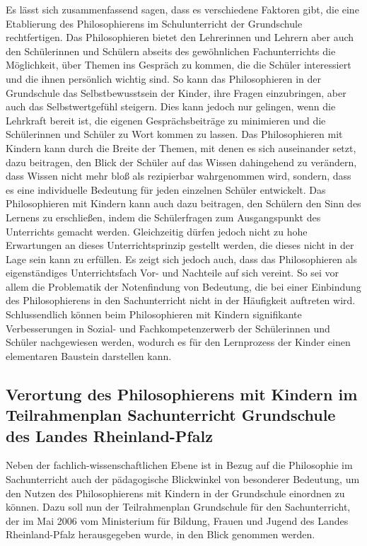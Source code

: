 Es lässt sich zusammenfassend sagen, dass es verschiedene Faktoren gibt, die eine Etablierung des Philosophierens im Schulunterricht der Grundschule rechtfertigen. 
Das Philosophieren bietet den Lehrerinnen und Lehrern aber auch den Schülerinnen und Schülern abseits des gewöhnlichen Fachunterrichts die Möglichkeit, über Themen ins Gespräch zu kommen, die die Schüler interessiert und die ihnen persönlich wichtig sind. 
So kann das Philosophieren in der Grundschule das Selbstbewusstsein der Kinder, ihre Fragen einzubringen, aber auch das Selbstwertgefühl steigern. 
Dies kann jedoch nur gelingen, wenn die Lehrkraft bereit ist, die eigenen Gesprächsbeiträge zu minimieren und die Schülerinnen und Schüler zu Wort kommen zu lassen.
Das Philosophieren mit Kindern kann durch die Breite der Themen, mit denen es sich auseinander setzt, dazu beitragen, den Blick der Schüler auf das Wissen dahingehend zu verändern, dass Wissen nicht mehr bloß als rezipierbar wahrgenommen wird, sondern, dass es eine individuelle Bedeutung für jeden einzelnen Schüler entwickelt.
Das Philosophieren mit Kindern kann auch dazu beitragen, den Schülern den Sinn des Lernens zu erschließen, indem die Schülerfragen zum Ausgangspunkt des Unterrichts gemacht werden.
Gleichzeitig dürfen jedoch nicht zu hohe Erwartungen an dieses Unterrichtsprinzip gestellt werden, die dieses nicht in der Lage sein kann zu erfüllen. 
Es zeigt sich jedoch auch, dass das Philosophieren als eigenständiges Unterrichtsfach Vor- und Nachteile auf sich vereint.
So sei vor allem die Problematik der Notenfindung von Bedeutung, die bei einer Einbindung des Philosophierens in den Sachunterricht nicht in der Häufigkeit auftreten wird.
Schlussendlich können beim Philosophieren mit Kindern signifikante Verbesserungen in Sozial- und Fachkompetenzerwerb der Schülerinnen und Schüler nachgewiesen werden, wodurch es für den Lernprozess der Kinder einen elementaren Baustein darstellen kann.

\newpage
\subsection{Verortung des Philosophierens mit Kindern im Teilrahmenplan Sachunterricht Grundschule des Landes Rheinland-Pfalz}

Neben der fachlich-wissenschaftlichen Ebene ist in Bezug auf die Philosophie im Sachunterricht auch der pädagogische Blickwinkel von besonderer Bedeutung, um den Nutzen des Philosophierens mit Kindern in der Grundschule einordnen zu können. 
Dazu soll nun der Teilrahmenplan Grundschule für den Sachunterricht, der im Mai 2006 vom Ministerium für Bildung, Frauen und Jugend des Landes Rheinland-Pfalz herausgegeben wurde, in den Blick genommen werden. 

